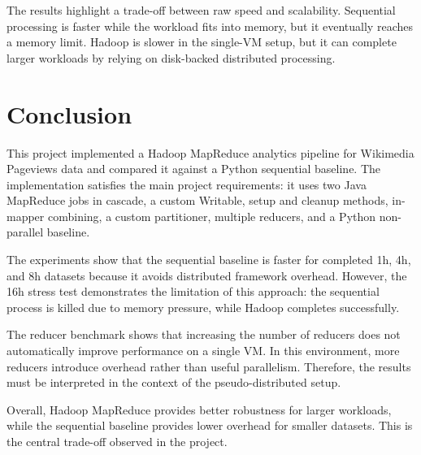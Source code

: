 \documentclass[12pt,a4paper]{report}
\begin{document}
The results highlight a trade-off between raw speed and scalability. Sequential processing is faster while the workload fits into memory, but it eventually reaches a memory limit. Hadoop is slower in the single-VM setup, but it can complete larger workloads by relying on disk-backed distributed processing.

\chapter{Conclusion}

This project implemented a Hadoop MapReduce analytics pipeline for Wikimedia Pageviews data and compared it against a Python sequential baseline. The implementation satisfies the main project requirements: it uses two Java MapReduce jobs in cascade, a custom Writable, setup and cleanup methods, in-mapper combining, a custom partitioner, multiple reducers, and a Python non-parallel baseline.

The experiments show that the sequential baseline is faster for completed 1h, 4h, and 8h datasets because it avoids distributed framework overhead. However, the 16h stress test demonstrates the limitation of this approach: the sequential process is killed due to memory pressure, while Hadoop completes successfully.

The reducer benchmark shows that increasing the number of reducers does not automatically improve performance on a single VM. In this environment, more reducers introduce overhead rather than useful parallelism. Therefore, the results must be interpreted in the context of the pseudo-distributed setup.

Overall, Hadoop MapReduce provides better robustness for larger workloads, while the sequential baseline provides lower overhead for smaller datasets. This is the central trade-off observed in the project.
\end{document}
